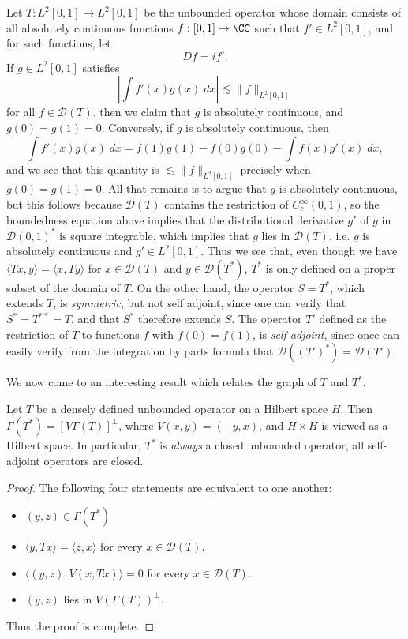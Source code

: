 \begin{example}
    Let $T: L^2[0,1] \to L^2[0,1]$ be the unbounded operator whose domain consists of all absolutely continuous functions $f: [0,1] \to \CC$ such that $f' \in L^2[0,1]$, and for such functions, let
    \[ Df = if'. \]
    If $g \in L^2[0,1]$ satisfies
    \[ \left| \int f'(x) g(x)\; dx \right| \lesssim \| f \|_{L^2[0,1]} \]
    for all $f \in \mathcal{D}(T)$, then we claim that $g$ is absolutely continuous, and $g(0) = g(1) = 0$. Conversely, if $g$ is absolutely continuous, then
    \[ \int f'(x) g(x)\; dx = f(1) g(1) - f(0) g(0) - \int f(x) g'(x)\; dx, \]
    and we see that this quantity is $\lesssim \| f \|_{L^2[0,1]}$ precisely when $g(0) = g(1) = 0$. All that remains is to argue that $g$ is absolutely continuous, but this follows because $\mathcal{D}(T)$ contains the restriction of $C_c^\infty(0,1)$, so the boundedness equation above implies that the distributional derivative $g'$ of $g$ in $\mathcal{D}(0,1)^*$ is square integrable, which implies that $g$ lies in $\mathcal{D}(T)$, i.e. $g$ is absolutely continuous and $g' \in L^2[0,1]$. Thus we see that, even though we have $\langle Tx, y \rangle = \langle x, Ty \rangle$ for $x \in \mathcal{D}(T)$ and $y \in \mathcal{D}(T^*)$, $T^*$ is only defined on a proper subset of the domain of $T$. On the other hand, the operator $ S = T^*$, which extends $T$, is \emph{symmetric}, but not self adjoint, since one can verify that $S^* = T^{**} = T$, and that $S^*$ therefore extends $S$. The operator $T'$ defined as the restriction of $T$ to functions $f$ with $f(0) = f(1)$, is \emph{self adjoint}, since once can easily verify from the integration by parts formula that $\mathcal{D}((T')^*) = \mathcal{D}(T')$.
\end{example}

We now come to an interesting result which relates the graph of $T$ and $T^*$.

\begin{theorem}
    Let $T$ be a densely defined unbounded operator on a Hilbert space $H$. Then $\Gamma(T^*) = [V \Gamma(T)]^\perp$, where $V(x,y) = (-y,x)$, and $H \times H$ is viewed as a Hilbert space. In particular, $T^*$ is \emph{always} a closed unbounded operator, all self-adjoint operators are closed.
\end{theorem}
\begin{proof}
    The following four statements are equivalent to one another:
    \begin{itemize}
        \item $(y,z) \in \Gamma(T^*)$
        \item $\langle y, Tx \rangle = \langle z, x \rangle$ for every $x \in \mathcal{D}(T)$.
        \item $\langle (y,z), V(x,Tx) \rangle = 0$ for every $x \in \mathcal{D}(T)$.
        \item $(y,z)$ lies in $V(\Gamma(T))^\perp$.
    \end{itemize}
    Thus the proof is complete.
\end{proof}

